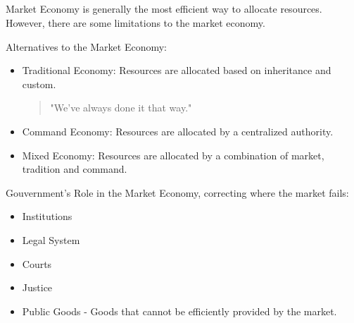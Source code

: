 \subsection{}
Market Economy is generally the most efficient way to allocate resources. However, there are some limitations to the market economy.

Alternatives to the Market Economy:
\begin{itemize}
    \item Traditional Economy: Resources are allocated based on inheritance and custom. \begin{quote}"We've always done it that way."\end{quote}
    \item Command Economy: Resources are allocated by a centralized authority.
    \item Mixed Economy: Resources are allocated by a combination of market, tradition and command.
\end{itemize}

Gouvernment's Role in the Market Economy, correcting where the market fails:
\begin{itemize}
    \item Institutions
    \item Legal System
    \item Courts
    \item Justice
    \item Public Goods - Goods that cannot be efficiently provided by the market.
\end{itemize}